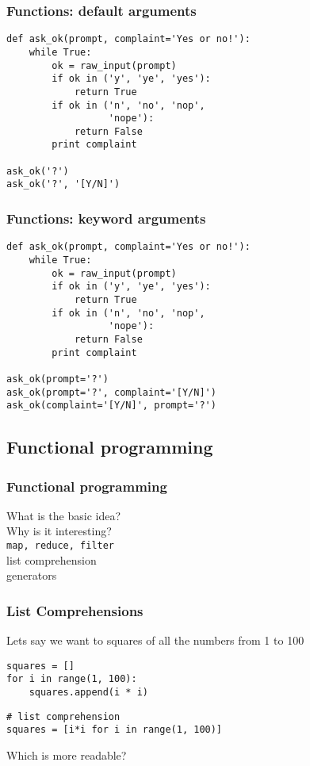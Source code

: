 \documentclass[14pt,compress]{beamer}
\newcounter{time}
\newcommand{\inctime}[1]{\addtocounter{time}{#1}{\tiny \thetime\ m}}
\newcommand{\typ}[1]{\texttt{#1}}
\begin{document}
\begin{frame}[fragile]
  \frametitle{Functions: default arguments}
  \small
  \begin{lstlisting}
def ask_ok(prompt, complaint='Yes or no!'):
    while True:
        ok = raw_input(prompt)
        if ok in ('y', 'ye', 'yes'): 
            return True
        if ok in ('n', 'no', 'nop',
                  'nope'): 
            return False
        print complaint

ask_ok('?')
ask_ok('?', '[Y/N]')
  \end{lstlisting}
\end{frame}

\begin{frame}[fragile]
  \frametitle{Functions: keyword arguments}
  \small
  \begin{lstlisting}
def ask_ok(prompt, complaint='Yes or no!'):
    while True:
        ok = raw_input(prompt)
        if ok in ('y', 'ye', 'yes'): 
            return True
        if ok in ('n', 'no', 'nop',
                  'nope'): 
            return False
        print complaint

ask_ok(prompt='?')
ask_ok(prompt='?', complaint='[Y/N]')
ask_ok(complaint='[Y/N]', prompt='?')
\end{lstlisting}
\inctime{15} 
\end{frame}

\subsection{Functional programming}
\begin{frame}[fragile]
    \frametitle{Functional programming}
What is the basic idea?\\
Why is it interesting?\\
\typ{map, reduce, filter}\\
list comprehension\\
generators
\end{frame}

\begin{frame}[fragile]
    \frametitle{List Comprehensions}
Lets say we want to squares of all the numbers from 1 to 100
    \begin{lstlisting}
squares = []
for i in range(1, 100):
    squares.append(i * i)
    \end{lstlisting}
    \begin{lstlisting}
# list comprehension
squares = [i*i for i in range(1, 100)]
     \end{lstlisting}
Which is more readable?
\end{frame}
\end{document}
